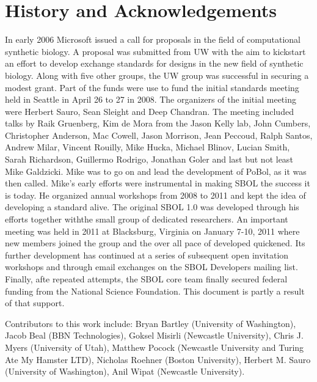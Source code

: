 \section{History and Acknowledgements}

In early 2006 Microsoft issued a call for proposals in the field of computational synthetic biology. A proposal was submitted from UW with the aim to kickstart an effort to develop exchange standards for designs in the new field of synthetic biology. Along with five other groups, the UW group was successful in securing a modest grant. Part of the funds were use to fund the initial standards meeting held in Seattle in April 26 to 27 in 2008. The organizers of the initial meeting were Herbert Sauro, Sean Sleight and Deep Chandran. The meeting included talks by Raik Gruenberg,  Kim de Mora from the Jason Kelly lab, John Cumbers,  Christopher Anderson, Mac Cowell, Jason Morrison, Jean Peccoud, Ralph Santos, Andrew Milar, Vincent Rouilly, Mike Hucka, Michael Blinov, Lucian Smith, Sarah Richardson, Guillermo Rodrigo, Jonathan Goler and last but not least Mike Galdzicki. Mike was to go on and lead the development of PoBol, as it was then called. Mike's early efforts were instrumental in making SBOL the success it is today. He organized annual workshops from 2008 to 2011 and kept the idea of developing a standard alive. The original SBOL 1.0 was developed through his efforts together withthe small group of dedicated researchers. An important meeting was held in 2011 at Blacksburg, Virginia on January 7-10, 2011 where new members joined the group and the over all pace of developed quickened. Its further development has continued at a series of subsequent open invitation workshops and through email exchanges on the SBOL Developers mailing list. Finally, afte repeated attempts, the SBOL core team finally secured federal funding from the National Science Foundation. This document is partly a result of that support.  

Contributors to this work include: Bryan Bartley (University of Washington), Jacob Beal (BBN Technologies), Goksel Misirli (Newcastle University), Chris J. Myers (University of Utah), Matthew Pocock (Newcastle University and Turing Ate My Hamster LTD), Nicholas Roehner (Boston University), Herbert M. Sauro (University of Washington), Anil Wipat (Newcastle University).


